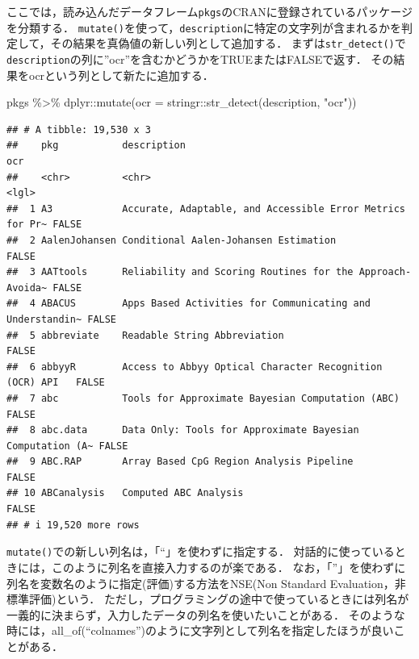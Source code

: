 \documentclass[
]{article}
\newenvironment{Shaded}{\begin{snugshade}}{\end{snugshade}}
\newcommand{\AttributeTok}[1]{\textcolor[rgb]{0.77,0.63,0.00}{#1}}
\newcommand{\FunctionTok}[1]{\textcolor[rgb]{0.00,0.00,0.00}{#1}}
\newcommand{\NormalTok}[1]{#1}
\newcommand{\SpecialCharTok}[1]{\textcolor[rgb]{0.00,0.00,0.00}{#1}}
\newcommand{\StringTok}[1]{\textcolor[rgb]{0.31,0.60,0.02}{#1}}
\begin{document}
ここでは，読み込んだデータフレーム\texttt{pkgs}のCRANに登録されているパッケージを分類する．
\texttt{mutate()}を使って，\texttt{description}に特定の文字列が含まれるかを判定して，その結果を真偽値の新しい列として追加する．
まずは\texttt{str\_detect()}で\texttt{description}の列に''ocr''を含むかどうかをTRUEまたはFALSEで返す．
その結果をocrという列として新たに追加する．

\begin{Shaded}
\begin{Highlighting}[]
\NormalTok{pkgs }\SpecialCharTok{\%\textgreater{}\%}
\NormalTok{  dplyr}\SpecialCharTok{::}\FunctionTok{mutate}\NormalTok{(}\AttributeTok{ocr =}\NormalTok{ stringr}\SpecialCharTok{::}\FunctionTok{str\_detect}\NormalTok{(description, }\StringTok{"ocr"}\NormalTok{))}
\end{Highlighting}
\end{Shaded}

\begin{verbatim}
## # A tibble: 19,530 x 3
##    pkg           description                                               ocr  
##    <chr>         <chr>                                                     <lgl>
##  1 A3            Accurate, Adaptable, and Accessible Error Metrics for Pr~ FALSE
##  2 AalenJohansen Conditional Aalen-Johansen Estimation                     FALSE
##  3 AATtools      Reliability and Scoring Routines for the Approach-Avoida~ FALSE
##  4 ABACUS        Apps Based Activities for Communicating and Understandin~ FALSE
##  5 abbreviate    Readable String Abbreviation                              FALSE
##  6 abbyyR        Access to Abbyy Optical Character Recognition (OCR) API   FALSE
##  7 abc           Tools for Approximate Bayesian Computation (ABC)          FALSE
##  8 abc.data      Data Only: Tools for Approximate Bayesian Computation (A~ FALSE
##  9 ABC.RAP       Array Based CpG Region Analysis Pipeline                  FALSE
## 10 ABCanalysis   Computed ABC Analysis                                     FALSE
## # i 19,520 more rows
\end{verbatim}

\texttt{mutate()}での新しい列名は，「``」を使わずに指定する．
対話的に使っているときには，このように列名を直接入力するのが楽である．
なお，「''」を使わずに列名を変数名のように指定(評価)する方法をNSE(Non Standard Evaluation，非標準評価)という．
ただし，プログラミングの途中で使っているときには列名が一義的に決まらず，入力したデータの列名を使いたいことがある．
そのような時には，all\_of(``colnames'')のように文字列として列名を指定したほうが良いことがある．
\end{document}
